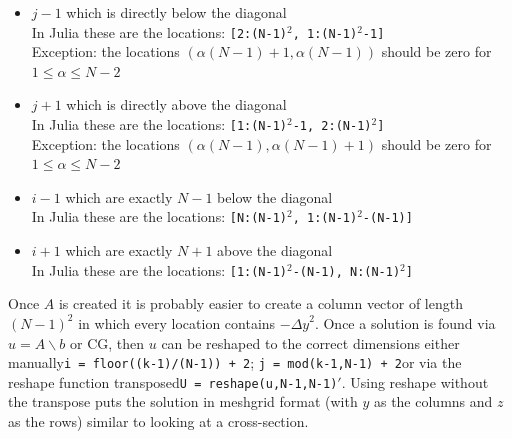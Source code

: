 \documentclass[11pt]{article}
\begin{document}
	\begin{itemize}
		\item $ j-1 $ which is directly below the diagonal\\
		In Julia these are the locations: \texttt{\footnotesize[2:(N-1)$^2$, 1:(N-1)$^2$-1]}\\
		Exception: the locations $ (\alpha(N-1) + 1,\alpha(N-1)) $ should be zero for $ 1\leq\alpha\leq N-2 $ 
		\item $ j+1 $ which is directly above the diagonal\\
		In Julia these are the locations: \texttt{\footnotesize[1:(N-1)$^2$-1, 2:(N-1)$^2$]}\\
		Exception: the locations $ (\alpha(N-1),\alpha(N-1)+1) $ should be zero for $ 1\leq\alpha\leq N-2 $ 
		\item $ i-1 $ which are exactly $ N-1 $ below the diagonal\\
		In Julia these are the locations: \texttt{\footnotesize[N:(N-1)$^2$, 1:(N-1)$^2$-(N-1)]}
		\item $ i+1 $ which are exactly $ N+1 $ above the diagonal\\
		In Julia these are the locations: \texttt{\footnotesize[1:(N-1)$^2$-(N-1), N:(N-1)$^2$]}
	\end{itemize}
	Once $ A $ is created it is probably easier to create a column vector of length $ (N-1)^2 $ in which every location contains $ -{\Delta y}^2 $. Once a solution is found via $ u = A\backslash b $ or CG, then $ u $ can be reshaped to the correct dimensions either manually\textemdash \texttt{\footnotesize i = floor((k-1)/(N-1)) + 2}; \texttt{\footnotesize j = mod(k-1,N-1) + 2}\textemdash or via the reshape function transposed\textemdash \texttt{\footnotesize U = reshape(u,N-1,N-1)$'$}. Using reshape without the transpose puts the solution in meshgrid format (with $ y $ as the columns and $ z $ as the rows) similar to looking at a cross-section.\\
	
\end{document}
